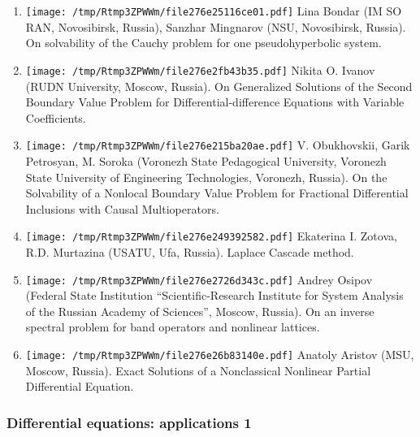\documentclass[
]{article}
\providecommand{\tightlist}{%
  \setlength{\itemsep}{0pt}\setlength{\parskip}{0pt}}
\begin{document}
\begin{enumerate}
\def\labelenumi{\arabic{enumi}.}
\tightlist
\item
  \protect\texttt{[image: /tmp/Rtmp3ZPWWm/file276e25116ce01.pdf]}
  Lina Bondar (IM SO RAN, Novosibirsk, Russia), Sanzhar Mingnarov (NSU,
  Novosibirsk, Russia). On solvability of the Cauchy problem for one
  pseudohyperbolic system.
\item
  \protect\texttt{[image: /tmp/Rtmp3ZPWWm/file276e2fb43b35.pdf]}
  Nikita O. Ivanov (RUDN University, Moscow, Russia). On Generalized
  Solutions of the Second Boundary Value Problem for
  Differential-difference Equations with Variable Coefficients.
\item
  \protect\texttt{[image: /tmp/Rtmp3ZPWWm/file276e215ba20ae.pdf]}
  V. Obukhovskii, Garik Petrosyan, M. Soroka (Voronezh State Pedagogical
  University, Voronezh State University of Engineering Technologies,
  Voronezh, Russia). On the Solvability of a Nonlocal Boundary Value
  Problem for Fractional Differential Inclusions with Causal
  Multioperators.
\item
  \protect\texttt{[image: /tmp/Rtmp3ZPWWm/file276e249392582.pdf]}
  Ekaterina I. Zotova, R.D. Murtazina (USATU, Ufa, Russia). Laplace
  Cascade method.
\item
  \protect\texttt{[image: /tmp/Rtmp3ZPWWm/file276e2726d343c.pdf]}
  Andrey Osipov (Federal State Institution ``Scientific-Research
  Institute for System Analysis of the Russian Academy of Sciences'',
  Moscow, Russia). On an inverse spectral problem for band operators and
  nonlinear lattices.
\item
  \protect\texttt{[image: /tmp/Rtmp3ZPWWm/file276e26b83140e.pdf]}
  Anatoly Aristov (MSU, Moscow, Russia). Exact Solutions of a
  Nonclassical Nonlinear Partial Differential Equation.
\end{enumerate}

\hypertarget{dea1}{%
\subsubsection{Differential equations: applications 1}\label{dea1}}
\end{document}
